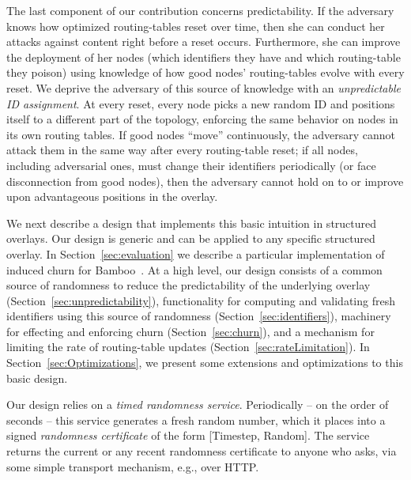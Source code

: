 \documentclass[10pt,twocolumn]{article}
\begin{document}
The last component of our contribution concerns predictability.  If the
adversary knows how optimized routing-tables reset over time, then she
can conduct her attacks against content right before a reset
occurs. Furthermore, she can improve the deployment of her nodes (which
identifiers they have and which routing-table they poison) using
knowledge of how good nodes' routing-tables evolve with every reset.  We
deprive the adversary of this source of knowledge with
an \emph{unpredictable ID assignment}.  At every reset, every node picks a
new random ID and positions itself to a different part
of the topology, enforcing the same behavior on nodes in its own routing
tables.  If
good nodes ``move'' continuously, the adversary cannot attack them in
the same way after every routing-table reset; if all nodes, including
adversarial ones, must change their identifiers periodically (or face
disconnection from good nodes), then the adversary cannot hold on to
or improve upon advantageous positions in the
overlay.

We next describe a design that implements this basic intuition in
structured overlays.
Our design is generic and can be applied to any
specific structured overlay.  In Section~\ref{sec:evaluation} we describe a
particular implementation of induced churn for
Bamboo~\cite{Rhea2004}.
At a high level, our design consists of a common source of randomness to
reduce the predictability of the underlying overlay
(Section~\ref{sec:unpredictability}), functionality for computing and
validating fresh identifiers using this source of randomness
(Section~\ref{sec:identifiers}), machinery for effecting and enforcing
churn  (Section~\ref{sec:churn}), and a
mechanism for limiting the rate of routing-table updates
(Section~\ref{sec:rateLimitation}).  In
Section~\ref{sec:Optimizations}, we
present some extensions and optimizations to this basic design.


\label{sec:unpredictability}

Our design relies on a \emph{timed randomness service}.
Periodically -- on the order of seconds -- this service
generates a fresh random number, which it places into a signed
\emph{randomness certificate} of the form [Timestep, Random].  The
service returns the current or any recent
randomness
certificate to anyone who asks, via some simple
transport mechanism, e.g., over HTTP.
\end{document}
